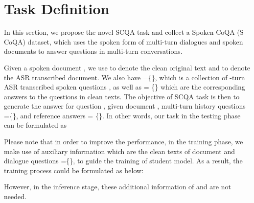 \documentclass[11pt]{article}
\begin{document}
\begin{table}[t]
\centering

\caption{Comparison of Spoken-CoQA with existing spoken question answering datasets. S-SQuAD and S-CoQA denote Spoken-SQuAD and Spoken-CoQA, respectively.}
\label{table:sqa-vs-scqa}
\vspace{-10pt}
\end{table}


 

\section{Task Definition}


In this section, we propose the novel SCQA task and collect a Spoken-CoQA (S-CoQA) dataset, which uses the spoken form of multi-turn dialogues and spoken documents to answer questions in multi-turn conversations.

Given a spoken document , we use  to denote the clean original text and  to denote the ASR transcribed document. We also have =\{\}, which is a collection of -turn ASR transcribed spoken questions , as well as = \{\} which are the corresponding answers to the questions in clean texts. The objective of SCQA task is then to generate the answer  for question , given document , multi-turn history questions =\{\}, and reference answers = \{\}. In other words, our task in the testing phase can be formulated as


Please note that in order to improve the performance, in the training phase, we make use of auxiliary information which are the clean texts of document  and dialogue questions =\{\}, to guide the training of student model. As a result, the training process could be formulated as below:

However, in the inference stage, these additional information of  and  are not needed.
\end{document}
